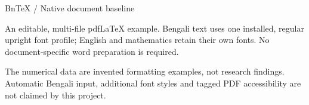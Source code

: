 \documentclass[12pt]{article}
\begin{document}
\ifnum{}\else\PackageError{bntex-demo}{Shell escape must be disabled}{}\fi
{\Large\sffamily BnTeX / Native document baseline\par}
\vspace{8mm}
{\LARGE{}\par}
\vspace{4mm}
An editable, multi-file pdfLaTeX example. Bengali text uses one installed,
regular upright font profile; English and mathematics retain their own fonts.
No document-specific word preparation is required.


\tableofcontents
\listoftables
\listoffigures
\vfill
\small
The numerical data are invented formatting examples, not research findings.
Automatic Bengali input, additional font styles and tagged PDF accessibility
are not claimed by this project.
\newpage

\newpage


\BnTeXNativeMemoStats
\end{document}
